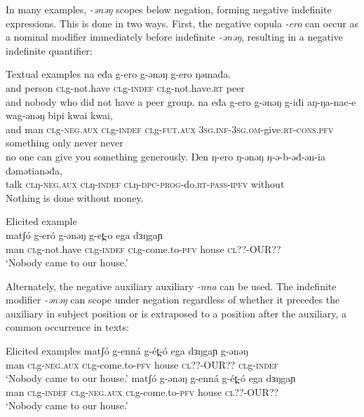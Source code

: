 
In many examples, \textit{-ənəŋ} scopes below negation, forming negative indefinite expressions. This is done in two ways. First, the negative copula \textit{-ero} can occur as a nominal modifier immediately before indefinite \textit{-ənəŋ}, resulting in a negative indefinite quantifier:

\ea Textual examples \label{neg1} %
\ea \gll na eđa g-ero g-ənəŋ g-ero ŋəmađa.\\
		and person \textsc{cl}g-not.have \textsc{cl}g-\textsc{indef} \textsc{cl}g-not.have.\textsc{rt} peer\\
	\glt and nobody who did not have a peer group.
	\ex \gll na eđa g-ero g-ǝnǝŋ g-iđi aŋ-ŋa-nac-e wag-ǝnǝŋ bipi kwai kwai,\\
and man \textsc{cl}g-\textsc{neg.aux} \textsc{cl}g-\textsc{indef} \textsc{cl}g-\textsc{fut.aux} 3\textsc{sg}.\textsc{inf}-3\textsc{sg.om}-give.\textsc{rt}-\textsc{cons}.\textsc{pfv} something only never never\\
	\glt  no one can give you something generously.
	\ex \gll Ŋen ŋ-ero ŋ-ǝnǝŋ ŋ-ǝ-b-ǝđ-ǝn-ia đǝmǝtianǝđa,\\
talk \textsc{cl}ŋ-\textsc{neg.aux} \textsc{cl}ŋ-\textsc{indef} \textsc{cl}ŋ-\textsc{dpc}-\textsc{prog}-do.\textsc{rt}-\textsc{pass}-\textsc{ipfv} without\\
	\glt Nothing is done without money.
		\z 
\z

	\ea Elicited example \label{neg2}\\
\gll matʃó g-eró g-ənəŋ g-et̪-o ega dɜŋgaɲ\\
man \textsc{cl}g-not.have \textsc{cl}g-\textsc{indef} \textsc{cl}g-come.to-\textsc{pfv} house \textsc{cl}??-OUR?? \\ %
	\glt ‘Nobody came to our house.’
	\z 

Alternately, the negative auxiliary auxiliary \textit{-nna} can be used. The indefinite modifier \textit{-ənəŋ} can scope under negation regardless of whether it precedes the auxiliary in subject position or is extraposed to a position after the auxiliary, a common occurrence in texts:

\ea Elicited examples %
	\ea \gll matʃó g-enná g-ét̪-ó ega dɜŋgaɲ g-ənəŋ\\
			man \textsc{cl}g-\textsc{neg.aux} \textsc{cl}g-come.to-\textsc{pfv} house \textsc{cl}??-OUR?? \textsc{cl}g-\textsc{indef}\\ 
			\glt ‘Nobody came to our house.’
	\ex \gll matʃó g-ənəŋ g-enná g-ét̪-ó ega dɜŋgaɲ\\
			man \textsc{cl}g-\textsc{indef} \textsc{cl}g-\textsc{neg.aux} \textsc{cl}g-come.to-\textsc{pfv} house \textsc{cl}??-OUR??\\
	\glt ‘Nobody came to our house.’
	\z
\z

